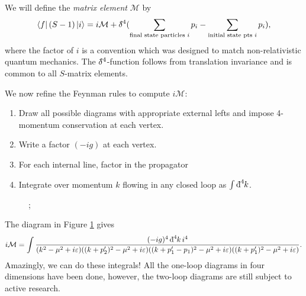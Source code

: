 \begin{definition}[]
  We will define the \emph{matrix element} $\mathcal{M}$ by 
  \begin{equation}
    \bra{f} (S-1) \ket{i} = i \mathcal{M} + \bdelta^4 (\sum_{\text{final state particles } i} p_i - \sum_{\text{initial state pts } i} p_i),
  \end{equation}
  where the factor of $i$ is a convention which was designed to match non-relativistic quantum mechanics. The $\bdelta^4$-function follows from translation invariance and is common to all $S$-matrix elements.
\end{definition}

We now refine the Feynman rules to compute $i \mathcal{M}$:
\begin{enumerate}
  \item Draw all possible diagrams with appropriate external lefts and impose 4-momentum conservation at each vertex.
  \item Write a factor $(-ig)$ at each vertex.
  \item For each internal line, factor in the propagator
  \item Integrate over momentum $k$ flowing in any closed loop as $\int \bdd[4]{k}$.
\end{enumerate}

\begin{figure}[htbp]
  \centering
  ;
  \caption{}
  \label{fig:abc}
\end{figure}

\begin{example}[$\phi \phi \to \phi \phi$]
  The diagram in Figure \ref{fig:abc} gives
  \begin{equation}
    i \mathcal{M} = \int \frac{(-ig)^4 \bdd[4]{k} i^4}{(k^2 - \mu^2 + i\varepsilon) ((k + p'_2)^2 - \mu^2 + i \varepsilon) ((k + p_1' - p_1)^2 - \mu^2 + i\varepsilon)((k+p_1')^2 - \mu^2 + i\varepsilon)}.
  \end{equation}
  Amazingly, we can do these integrals!
  All the one-loop diagrams in four dimensions have been done, however, the two-loop diagrams are still subject to active research.
\end{example}
